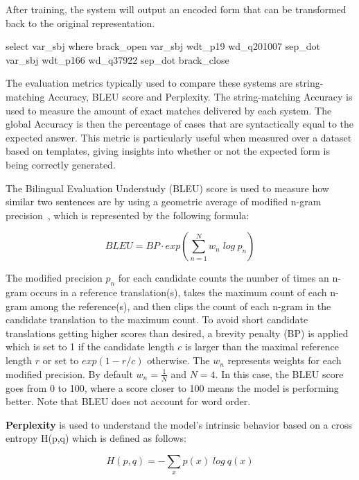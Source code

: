 After training, the system will output an encoded form that can be transformed back to the 
original \SPARQL{} representation. 

\begin{sparqlcode}[%
    caption={\SPARQL{} query after encoding (note it excludes the \texttt{PREFIX} clauses).}, 
    label={lst:encodedWikidataSparqlExample}]
select var_sbj where brack_open var_sbj wdt_p19 wd_q201007 sep_dot var_sbj wdt_p166 wd_q37922 sep_dot brack_close
\end{sparqlcode}

The evaluation metrics typically used to compare these systems are string-matching Accuracy, 
BLEU score and Perplexity. The string-matching Accuracy is used to measure the amount of exact 
matches delivered by each system. The global Accuracy is then the percentage of cases that are 
syntactically equal to the expected answer. This metric is particularly useful when measured 
over a dataset based on \SPARQL{} templates, giving insights into whether or not the expected 
\SPARQL{} form is being correctly generated.

The Bilingual Evaluation Understudy (BLEU) score is used to measure how similar two sentences 
are by using a geometric average of modified n-gram precision~\cite{nlToSparql:PapineniRWZ02}, 
which is represented by the following formula:

\[
    BLEU = BP \cdot exp(\sum_{n=1}^N w_n \; log \: p_n)    
\]

The modified precision $p_n$ for each candidate counts the number of times an n-gram occurs in a 
reference translation(s), takes the maximum count of each n-gram among the reference(s), and 
then clips the count of each n-gram in the candidate translation to the maximum count. To avoid 
short candidate translations getting higher scores than desired, a brevity penalty (BP) is 
applied which is set to 1 if the candidate length $c$ is larger than the maximal reference 
length $r$ or set to $exp(1-r/c)$ otherwise. The $w_n$ represents weights for each modified 
precision. By default $w_n=\frac{1}{N}$ and $N=4$. In this case, the BLEU score goes from 0 to 
100, where a score closer to 100 means the model is performing better. Note that BLEU does not 
account for word order. 

\textbf{Perplexity} is used to understand the model’s intrinsic behavior based on a cross 
entropy H(p,q) which is defined as follows:

\[
    H(p,q)= -\sum_x p(x) \; log \: q(x)
\]

